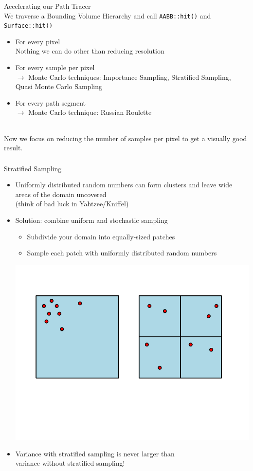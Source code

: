 \documentclass[utf8,stillsansserifmath,fleqn,t]{beamer}
\newcommand{\code}[1]{\texttt{#1}}
\begin{document}
\begin{frame}
\frametitle{\insertsection}
Accelerating our Path Tracer\\[1ex]
We traverse a Bounding Volume Hierarchy and call \code{AABB::hit()} and \code{Surface::hit()}
\begin{itemize}
\item For every pixel\\
    Nothing we can do other than reducing resolution
\item For every sample per pixel\\
    $\rightarrow$ Monte Carlo techniques: Importance Sampling, Stratified Sampling, Quasi Monte Carlo Sampling
\item For every path segment\\
    $\rightarrow$ Monte Carlo technique: Russian Roulette
\end{itemize}
~\\
Now we focus on reducing the number of samples per pixel
to get a visually good result.
\end{frame}

\begin{frame}[label=stratified-1]
\frametitle{\insertsection}
Stratified Sampling
\begin{itemize}
\item Uniformly distributed random numbers can form clusters and leave wide areas of the domain uncovered\\
(think of bad luck in Yahtzee/Kniffel)\\
\item Solution: combine uniform and stochastic sampling
    \begin{itemize}
    \item Subdivide your domain into equally-sized patches
    \item Sample each patch with uniformly distributed random numbers
    \end{itemize}
    \includegraphics[width=.5\textwidth]{./fig/stratified-sampling.pdf}
\item Variance with stratified sampling is never larger than\\
    variance without stratified sampling!
\end{itemize}
\end{frame}
\end{document}
